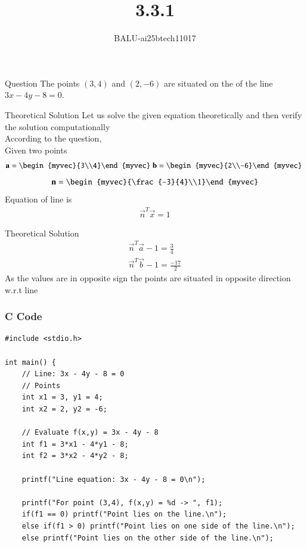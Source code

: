 \documentclass{beamer}
\title %
{3.3.1}
\author %
{BALU-ai25btech11017}
\begin{document}
\frame{\titlepage}
\begin{frame}{Question}
The points \((3, 4)\) and \((2, -6)\) are situated on the \underline{\hspace{2cm}} of the line \(3x - 4y - 8 = 0\).\\ 
\end{frame}
\begin{frame}{Theoretical Solution}
Let us solve the given equation theoretically and then verify the solution computationally \\
According to the question, \\
Given two points\\
\begin{align}
\vec{a}=\begin{myvec}{3\\4}\end{myvec}\
\vec{b}=\begin{myvec}{2\\-6}\end{myvec}\
\end{align}
\begin{align}
\vec{n}=\begin{myvec}{\frac{-3}{4}\\1}\end{myvec}
\end{align}
Equation of line is
\begin{align}
    \vec{n}^T\vec{x}=1
\end{align}
\end{frame}
\begin{frame}{Theoretical Solution}
\begin{align}
    \vec{n}^T\vec{a}-1=\frac{3}{4}\\
    \vec{n}^T\vec{b}-1=\frac{-17}{2}
\end{align}
As the values are in opposite sign the points are situated in opposite direction w.r.t line
\end{frame}
\begin{frame}[fragile]
    \frametitle{C Code}

    \begin{lstlisting}
#include <stdio.h>

int main() {
    // Line: 3x - 4y - 8 = 0
    // Points
    int x1 = 3, y1 = 4;
    int x2 = 2, y2 = -6;

    // Evaluate f(x,y) = 3x - 4y - 8
    int f1 = 3*x1 - 4*y1 - 8;
    int f2 = 3*x2 - 4*y2 - 8;

    printf("Line equation: 3x - 4y - 8 = 0\n");

    printf("For point (3,4), f(x,y) = %d -> ", f1);
    if(f1 == 0) printf("Point lies on the line.\n");
    else if(f1 > 0) printf("Point lies on one side of the line.\n");
    else printf("Point lies on the other side of the line.\n");

   

     \end{lstlisting}
\end{frame}
\end{document}
